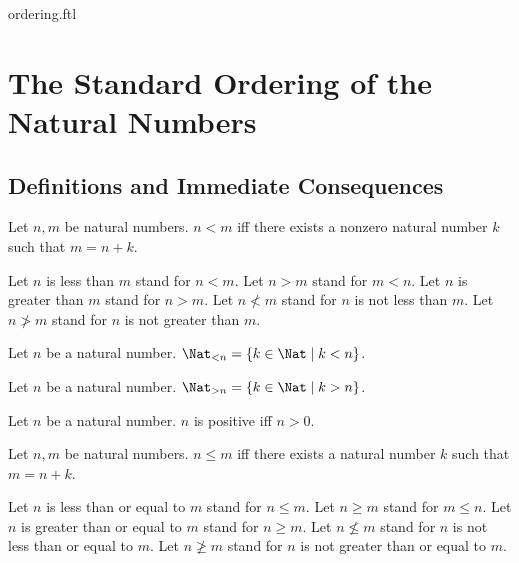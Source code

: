 \documentclass{naproche-library}
\begin{document}
\begin{smodule}{ordering.ftl}

  \section*{The Standard Ordering of the Natural Numbers}

  \subsection*{Definitions and Immediate Consequences}

  \begin{definition}[forthel,id=ARITHMETIC_04_1926295512416256,printid]
    Let $n, m$ be natural numbers.
    $n < m$ iff there exists a nonzero natural number $k$ such that $m = n + k$.

    Let $n$ is less than $m$ stand for $n < m$.
    Let $n > m$ stand for $m < n$.
    Let $n$ is greater than $m$ stand for $n > m$.
    Let $n \nless m$ stand for $n$ is not less than $m$.
    Let $n \ngtr m$ stand for $n$ is not greater than $m$.
  \end{definition}

  \begin{definition}[forthel,id=ARITHMETIC_04_3668680374222848,printid]
    Let $n$ be a natural number.
    $\Nat_{< n} = \{ k \in \Nat \mid k < n \}$.
  \end{definition}

  \begin{definition}[forthel,id=ARITHMETIC_04_3670333934534656,printid]
    Let $n$ be a natural number.
    $\Nat_{> n} = \{ k \in \Nat \mid k > n \}$.
  \end{definition}

  \begin{definition}[forthel,id=ARITHMETIC_04_7916616566177792,printid]
    Let $n$ be a natural number.
    $n$ is positive iff $n > 0$.
\end{definition}

  \begin{definition}[forthel,id=ARITHMETIC_04_4593841531256832,printid]
    Let $n, m$ be natural numbers.
    $n \leq m$ iff there exists a natural number $k$ such that $m = n + k$.

    Let $n$ is less than or equal to $m$ stand for $n \leq m$.
    Let $n \geq m$ stand for $m \leq n$.
    Let $n$ is greater than or equal to $m$ stand for $n \geq m$.
    Let $n \nleq m$ stand for $n$ is not less than or equal to $m$.
    Let $n \ngeq m$ stand for $n$ is not greater than or equal to $m$.
  \end{definition}


\end{smodule}
\end{document}
